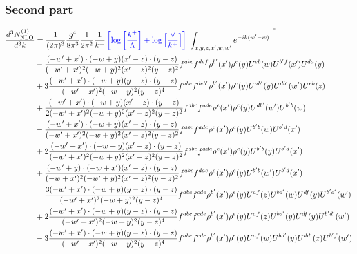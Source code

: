 \documentclass[aps,prd,amsmath,amssymb,nofootinbib]{revtex4-2}
\numberwithin{equation}{section}
\begin{document}
\subsubsection{Second part}
\begin{align}
     \frac{d^{3}N^{(1)}_{\rm NLO}}{d^{3}k} & = \frac{1}{(2\pi)^{3}}\frac{g^{4}}{8\pi^{3}}\frac{1}{2\pi^{2}} \frac{1}{k^{+}}\,{\color{blue}\left[\log{\left[\frac{k^{+}}{\Lambda}\right]}+\log{\left[\frac{\vee}{k^{+}}\right]}\right]}\,\,\int_{x,y,z,x^{\prime},w,w^{\prime}}e^{-ik(w^{\prime}-w)}\, \Bigg[\notag \\ & - \frac{( - w' + x') \cdot ( - w + y) (x' - z) \cdot (y - z)}{( - w' + x')^{2} ( - w + y)^{2} (x' - z)^{2} (y - z)^{2}} f^{a b c} f^{d e f} \rho^{b'}(x') \rho^{c}(y) U^{e b}(w) U^{b' f}(x') U^{d a}(y) \nonumber\\
      &+ 3 \frac{( - w' + x') \cdot ( - w + y) (y - z) \cdot (y - z)}{( - w' + x')^{2} ( - w + y)^{2} (y - z)^{4}} f^{a b c} f^{d e b'} \rho^{b'}(x') \rho^{c}(y) U^{a b'}(y) U^{d b'}(w') U^{e b}(z)\nonumber\\
    &+\frac{( - w' + x') \cdot ( - w + y) (x' - z) \cdot (y - z)}{2 ( - w' + x')^{2} ( - w + y)^{2} (x' - z)^{2} (y - z)^{2}} f^{a b c} f^{a d e} \rho^{e}(x') \rho^{c}(y) U^{d b'}(w') U^{b' b}(w)\nonumber\\
    &- \frac{( - w' + x') \cdot ( - w + y) (x' - z) \cdot (y - z)}{( - w' + x')^{2} ( - w + y)^{2} (x' - z)^{2} (y - z)^{2}} f^{a b c} f^{a d e} \rho^{e}(x') \rho^{c}(y) U^{b' b}(w) U^{b' d}(x')\nonumber\\
    &+ 2 \frac{( - w' + x') \cdot ( - w + y) (x' - z) \cdot (y - z)}{( - w' + x')^{2} ( - w + y)^{2} (x' - z)^{2} (y - z)^{2}} f^{a b c} f^{a d e} \rho^{e}(x') \rho^{c}(y) U^{b' b}(y) U^{b' d}(x')\nonumber\\
    &+ \frac{( - w' + y) \cdot ( - w + x') (x' - z) \cdot (y - z)}{( - w + x')^{2} ( - w' + y)^{2} (x' - z)^{2} (y - z)^{2}} f^{a b c} f^{d a e} \rho^{e}(x') \rho^{c}(y) U^{b' b}(w') U^{b' d}(x')\nonumber\\
    &-\frac{3 ( - w' + x') \cdot ( - w + y) (y - z) \cdot (y - z)}{( - w' + x')^{2} ( - w + y)^{2} (y - z)^{4}} f^{a b c} f^{c d e} \rho^{b'}(x') \rho^{e}(y) U^{a f}(z) U^{b d'}(w) U^{d f}(y) U^{b' d'}(w')\nonumber\\
    &+ 2 \frac{( - w' + x') \cdot ( - w + y) (y - z) \cdot (y - z)}{( - w' + x')^{2} ( - w + y)^{2} (y - z)^{4}} f^{a b c} f^{c d e} \rho^{b'}(x') \rho^{e}(y) U^{a f}(z) U^{b d'}(y) U^{d f}(y) U^{b' d'}(w')\nonumber\\
    &- 3 \frac{( - w' + x') \cdot ( - w + y) (y - z) \cdot (y - z)}{( - w' + x')^{2} ( - w + y)^{2} (y - z)^{4}} f^{a b c} f^{c d e} \rho^{b'}(x') \rho^{e}(y) U^{a f}(w) U^{b d'}(y) U^{d d'}(z) U^{b' f}(w')\nonumber\\

\end{align}
\end{document}
